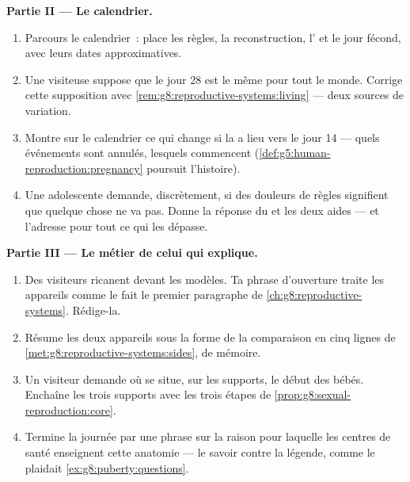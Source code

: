 \begin{problem}
\medskip\noindent\textbf{Partie II --- Le calendrier.}
\begin{enumerate}[resume]
  \item Parcours le calendrier~: place les règles, la
        reconstruction, l' et le jour fécond, avec leurs
        dates approximatives.
  \item Une visiteuse suppose que le jour 28 est le même pour tout
        le monde. Corrige cette supposition avec
        \cref{rem:g8:reproductive-systems:living} --- deux sources
        de variation.
  \item Montre sur le calendrier ce qui change si la  a
        lieu vers le jour 14 --- quels événements sont annulés,
        lesquels commencent
        (\cref{def:g5:human-reproduction:pregnancy} poursuit
        l'histoire).
  \item Une adolescente demande, discrètement, si des douleurs de
        règles signifient que quelque chose ne va pas. Donne la
        réponse du  et les deux aides --- et l'adresse pour
        tout ce qui les dépasse.
\end{enumerate}

\medskip\noindent\textbf{Partie III --- Le métier de celui qui
explique.}
\begin{enumerate}[resume]
  \item Des visiteurs ricanent devant les modèles. Ta phrase
        d'ouverture traite les appareils comme le fait le premier
        paragraphe de
        \cref{ch:g8:reproductive-systems}. Rédige-la.
  \item Résume les deux appareils sous la forme de la comparaison
        en cinq lignes de
        \cref{met:g8:reproductive-systems:sides}, de mémoire.
  \item Un visiteur demande où se situe, sur les supports, le début
        des bébés. Enchaîne les trois supports avec les trois étapes
        de \cref{prop:g8:sexual-reproduction:core}.
  \item Termine la journée par une phrase sur la raison pour
        laquelle les centres de santé enseignent cette anatomie ---
        le savoir contre la légende, comme le plaidait
        \cref{ex:g8:puberty:questions}.
\end{enumerate}
\end{problem}
